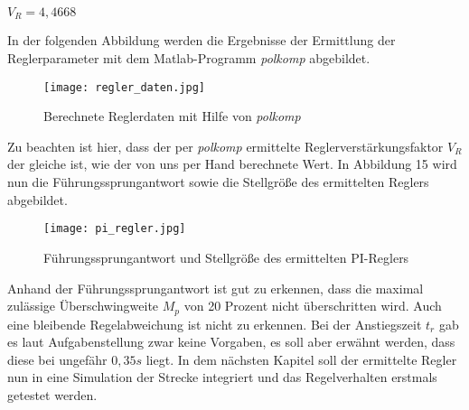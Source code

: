 \begin{center}
$V_{R}=4,4668$
\end{center}

In der folgenden Abbildung werden die Ergebnisse der Ermittlung der Reglerparameter mit dem Matlab-Programm \textit{polkomp} abgebildet.

\newpage

\begin{figure}[h]
	\begin{center}
		\texttt{[image: regler\_daten.jpg]}
		\caption{Berechnete Reglerdaten mit Hilfe von \textit{polkomp}}
       \label{controllerData}
	\end{center} 
\end{figure}

Zu beachten ist hier, dass der per \textit{polkomp} ermittelte Reglerverstärkungsfaktor $V_{R}$ der gleiche ist, wie der von uns per Hand berechnete Wert. In Abbildung 15 wird nun die Führungssprungantwort sowie die Stellgröße des ermittelten Reglers abgebildet.

\newpage

\begin{figure}[h]
	\begin{center}
		\texttt{[image: pi\_regler.jpg]}
		\caption{Führungssprungantwort und Stellgröße des ermittelten PI-Reglers}
       \label{controller}
	\end{center} 
\end{figure}

Anhand der Führungssprungantwort ist gut zu erkennen, dass die maximal zulässige Überschwingweite $M_{p}$ von 20 Prozent nicht überschritten wird. Auch eine bleibende Regelabweichung ist nicht zu erkennen. Bei der Anstiegszeit $t_{r}$ gab es laut Aufgabenstellung zwar keine Vorgaben, es soll aber erwähnt werden, dass diese bei ungefähr $0,35s$ liegt. In dem nächsten Kapitel soll der ermittelte Regler nun in eine Simulation der Strecke integriert und das Regelverhalten erstmals getestet werden.

















